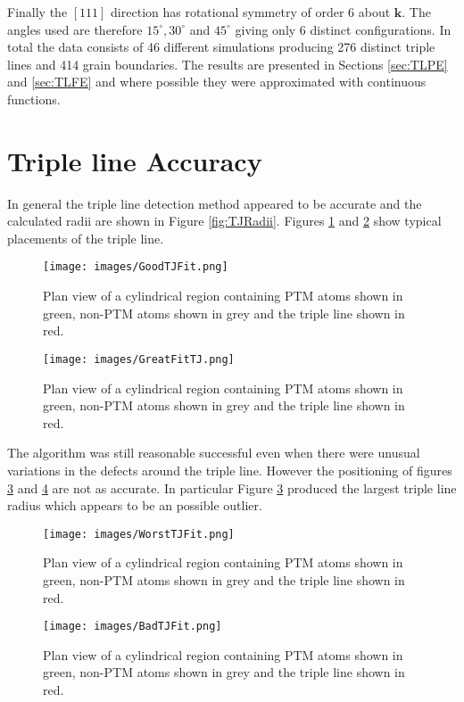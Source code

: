 \documentclass[12pt,a4paper,openany]{report}
\begin{document}
Finally the $[1 1 1]$ direction has rotational symmetry of order 6 about $\mathbf{k}$. The angles used are therefore $15^{\circ},30^{\circ}$  and $45^{\circ}$ giving only 6 distinct configurations. In total the data consists of 46 different simulations producing 276 distinct triple lines and 414 grain boundaries. The results are presented in Sections \ref{sec:TLPE} and \ref{sec:TLFE} and where possible they were approximated with continuous functions.  

\section{Triple line Accuracy}

In general the triple line detection method appeared to be accurate and the calculated radii are shown in Figure \ref{fig:TJRadii}. Figures  
\ref{fig:TJGoodFit} and \ref{fig:GreatTJFit} show typical placements of the triple line.

\begin{figure}[H]
	\centering
	\texttt{[image: images/GoodTJFit.png]} 
	\caption{Plan view of a cylindrical region containing PTM atoms shown in green, non-PTM atoms shown in grey and the triple line shown in red.} 
	\label{fig:TJGoodFit}
\end{figure}

\begin{figure}[H]
	\centering
	\texttt{[image: images/GreatFitTJ.png]} 
	\caption{Plan view of a cylindrical region containing PTM atoms shown in green, non-PTM atoms shown in grey and the triple line shown in red.} 
	\label{fig:GreatTJFit}
\end{figure}

The algorithm was still reasonable successful even when there were unusual variations in the defects around the triple line. However the positioning of figures \ref{fig:WorstTJFit} and  \ref{fig:BadTJFit} are not as accurate. In particular Figure \ref{fig:WorstTJFit} produced the largest triple line radius which appears to be an possible outlier.  

\begin{figure}[H]
	\centering
	\texttt{[image: images/WorstTJFit.png]} 
	\caption{Plan view of a cylindrical region containing PTM atoms shown in green, non-PTM atoms shown in grey and the triple line shown in red.}
	\label{fig:WorstTJFit}
\end{figure}


\begin{figure}[H]
	\centering
	\texttt{[image: images/BadTJFit.png]} 
	\caption{Plan view of a cylindrical region containing PTM atoms shown in green, non-PTM atoms shown in grey and the triple line shown in red.}
	\label{fig:BadTJFit}
\end{figure}
\end{document}
